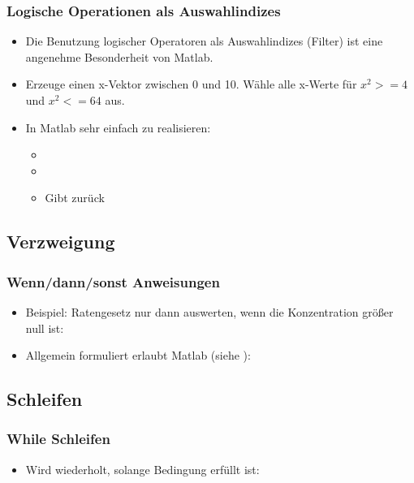       \begin{frame}
          \frametitle{Logische Operationen als Auswahlindizes}
          \begin{itemize}
            \item Die Benutzung logischer Operatoren als Auswahlindizes (Filter) ist eine angenehme Besonderheit von Matlab.
            \item Erzeuge einen x-Vektor zwischen 0 und 10. Wähle alle x-Werte für $x^2>=4$ und $x^2<=64$ aus.
            \item In Matlab sehr einfach zu realisieren:
            \begin{itemize}
              \item {}
              \item {}
              \item Gibt \matlabOutput{[2 3 4 5 6 7 8]} zurück
            \end{itemize}
          \end{itemize}
        \end{frame}

      \subsection{Verzweigung}
      \begin{frame}
          \frametitle{Wenn/dann/sonst Anweisungen}
          \begin{itemize}
            \item Beispiel: Ratengesetz nur dann auswerten, wenn die Konzentration größer null ist:
            
            \item Allgemein formuliert erlaubt Matlab (siehe ):
            
          \end{itemize}
      \end{frame}

      \subsection{Schleifen}
      \begin{frame}
          \frametitle{While Schleifen}
          \begin{itemize}
            \item Wird wiederholt, solange Bedingung erfüllt ist:
            
          \end{itemize}
      \end{frame}

